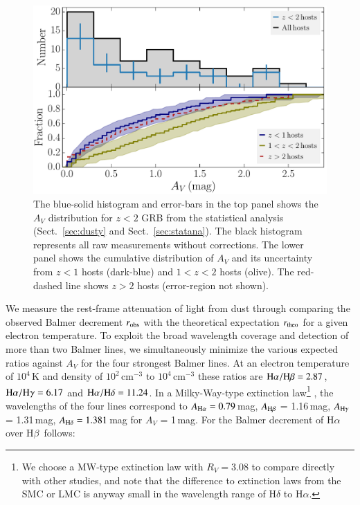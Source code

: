 \documentclass[traditabstract, longauth]{aa}
\newcommand{\hb}{H$\beta$}
\newcommand{\ha}{H$\alpha$}
\begin{document}
\begin{figure}
\includegraphics[angle=0, width=0.99\columnwidth]{Figs/EBV_histogram.pdf}
\caption{The blue-solid histogram and error-bars in the top panel shows the $A_V$ distribution for $z < 2$ GRB from the statistical analysis (Sect.~\ref{sec:dusty} and Sect.~\ref{sec:statana}). The black histogram represents all raw measurements without corrections. The lower panel shows the cumulative distribution of $A_V$ and its uncertainty from $z<1$ hosts (dark-blue) and $1<z<2$ hosts (olive). The red-dashed line shows $z>2$ hosts (error-region not shown).}
\label{fig:ebvhist}
\end{figure}

We measure the rest-frame attenuation of light from dust through comparing the observed Balmer decrement $r_{\rm{obs}}$ with the theoretical expectation $r_{\rm{theo}}$ for a given electron temperature. To exploit the broad wavelength coverage and detection of more than two Balmer lines, we simultaneously minimize the various expected ratios against $A_V$ for the four strongest Balmer lines. At an electron temperature of $10^4$\,K and density of $10^{2}$\,cm$^{-3}$ to $10^{4}$\,cm$^{-3}$ these ratios are \citep{1989agna.book.....O} $\rm{H}\alpha/\rm{H}\beta = 2.87$, $\rm{H}\alpha/\rm{H}\gamma = 6.17$ and $\rm{H}\alpha/\rm{H}\delta = 11.24$. In a Milky-Way-type extinction law\footnote{We choose a MW-type extinction law with $R_V=3.08$ to compare directly with other studies, and note that the difference to extinction laws from the SMC or LMC is anyway small in the wavelength range of H$\delta$ to H$\alpha$.} \citep[][]{1992ApJ...395..130P}, the wavelengths of the four lines correspond to $A_{\rm{H}\alpha} = 0.79$\,mag, $A_{\rm{H}\beta}$ = 1.16\,mag, $A_{\rm{H}\gamma}$ = 1.31\,mag, $A_{\rm{H}\delta} = 1.381$\,mag for $A_V$ = 1\,mag. For the Balmer decrement of \ha\, over \hb\, follows:
\end{document}
